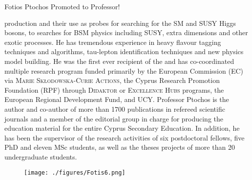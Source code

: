 \begin{headline}[enhanced, tikz={rotate=0}]{Fotios Ptochos Promoted to Professor!}
\begin{multicols}{2}
    production and their use as probes for searching for the SM and SUSY
    Higgs bosons, to searches for BSM physics including SUSY, extra
    dimensions and other exotic processes. He has tremendous experience in
    heavy flavour tagging techniques and algorithms, tau-lepton
    identification techniques and new physics model building. 
    He was the first ever recipient of the  and has co-coordinated multiple research program
    funded primarily by the European Commission (EC) via \textsc{Marie
    Skłodowska-Curie Actions},  the Cyprus Research Promotion
    Foundation (RPF) through \textsc{Didaktor} or \textsc{Excellence
      Hubs} programs, the European Regional Development Fund, and
    UCY. Professor Ptochos is the author and co-author of more than 
    1700 publications in refereed scientific journals and a member of the
    editorial group in charge for producing the education material
    for the entire Cyprus Secondary Education. In addition, he has
    been the supervisor of the research activities of six postdoctoral
    fellows, five PhD and eleven MSc students, as well as the theses
    projects of more than 20 undergraduate students. 

    \begin{figure}
      \begin{center}
        \vspace{-0.2in}
        \leavevmode
        \texttt{[image: ./figures/Fotis6.png]}
      \end{center}
    \end{figure}
  \end{multicols}
\end{headline}
